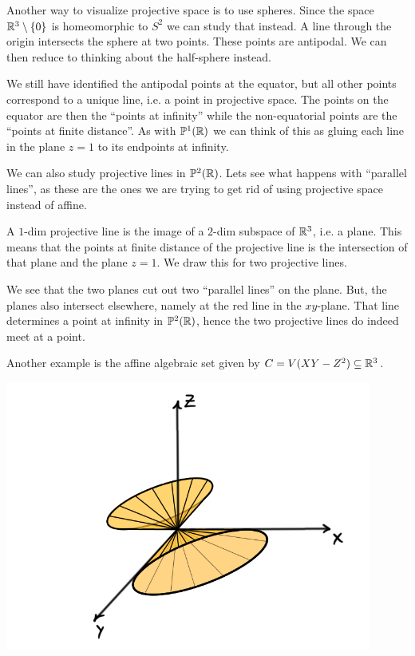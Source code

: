 Another way to visualize projective space is to use spheres. Since the space $\mathbb{R}^3\setminus \{0\}$ is homeomorphic to $S^2$ we can study that instead. A line through the origin intersects the sphere at two points. These points are antipodal. We can then reduce to thinking about the half-sphere instead.

\begin{center}
\def\svgwidth{0.4\textwidth}

\end{center}

We still have identified the antipodal points at the equator, but all other points correspond to a unique line, i.e. a point in projective space. The points on the equator are then the ``points at infinity'' while the non-equatorial points are the ``points at finite distance''. As with $\mathbb{P}^1(\mathbb{R})$ we can think of this as gluing each line in the plane $z=1$ to its endpoints at infinity. 

\begin{example}
We can also study projective lines in $\mathbb{P}^2(\mathbb{R})$. Lets see what happens with ``parallel lines'', as these are the ones we are trying to get rid of using projective space instead of affine. 

A $1$-dim projective line is the image of a $2$-dim subspace of $\mathbb{R}^3$, i.e. a plane. This means that the points at finite distance of the projective line is the intersection of that plane and the plane $z=1$. We draw this for two projective lines.

\begin{center}
\def\svgwidth{0.4\textwidth}

\end{center}


We see that the two planes cut out two ``parallel lines'' on the plane. But, the planes also intersect elsewhere, namely at the red line in the $xy$-plane. That line determines a point at infinity in $\mathbb{P}^2(\mathbb{R})$, hence the two projective lines do indeed meet at a point. 

\end{example}

Another example is the affine algebraic set given by $C=V(XY-Z^2)\subseteq \mathbb{R}^3$. 
\begin{center}
\includegraphics[width=12cm]{img/lecture_7/double_cone.png}    
\end{center}

